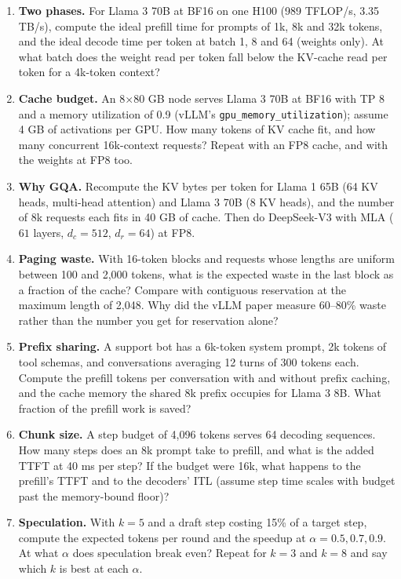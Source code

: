 \documentclass[11pt,letterpaper]{article}
\begin{document}
\begin{enumerate}[leftmargin=1.6em,itemsep=6pt]
\item \textbf{Two phases.} For Llama 3 70B at BF16 on one H100 (989 TFLOP/s, 3.35 TB/s), compute the ideal prefill time for prompts of 1k, 8k and 32k tokens, and the ideal decode time per token at batch 1, 8 and 64 (weights only). At what batch does the weight read per token fall below the KV-cache read per token for a 4k-token context?
\item \textbf{Cache budget.} An 8$\times$80 GB node serves Llama 3 70B at BF16 with TP 8 and a memory utilization of 0.9 (vLLM's \texttt{gpu\_memory\_utilization}); assume 4 GB of activations per GPU. How many tokens of KV cache fit, and how many concurrent 16k-context requests? Repeat with an FP8 cache, and with the weights at FP8 too.
\item \textbf{Why GQA.} Recompute the KV bytes per token for Llama 1 65B (64 KV heads, multi-head attention) and Llama 3 70B (8 KV heads), and the number of 8k requests each fits in 40 GB of cache. Then do DeepSeek-V3 with MLA ($61$ layers, $d_c=512$, $d_r=64$) at FP8.
\item \textbf{Paging waste.} With 16-token blocks and requests whose lengths are uniform between 100 and 2,000 tokens, what is the expected waste in the last block as a fraction of the cache? Compare with contiguous reservation at the maximum length of 2,048. Why did the vLLM paper measure 60--80\% waste rather than the number you get for reservation alone?
\item \textbf{Prefix sharing.} A support bot has a 6k-token system prompt, 2k tokens of tool schemas, and conversations averaging 12 turns of 300 tokens each. Compute the prefill tokens per conversation with and without prefix caching, and the cache memory the shared 8k prefix occupies for Llama 3 8B. What fraction of the prefill work is saved?
\item \textbf{Chunk size.} A step budget of 4,096 tokens serves 64 decoding sequences. How many steps does an 8k prompt take to prefill, and what is the added TTFT at 40 ms per step? If the budget were 16k, what happens to the prefill's TTFT and to the decoders' ITL (assume step time scales with budget past the memory-bound floor)?
\item \textbf{Speculation.} With $k=5$ and a draft step costing 15\% of a target step, compute the expected tokens per round and the speedup at $\alpha=0.5,0.7,0.9$. At what $\alpha$ does speculation break even? Repeat for $k=3$ and $k=8$ and say which $k$ is best at each $\alpha$.

\end{enumerate}
\end{document}
